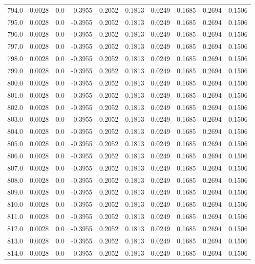 \begin{longtable}{lrrrrrrrrr}
794.0 & 0.0028 & 0.0 & -0.3955 & 0.2052 & 0.1813 & 0.0249 & 0.1685 & 0.2694 & 0.1506 \\
795.0 & 0.0028 & 0.0 & -0.3955 & 0.2052 & 0.1813 & 0.0249 & 0.1685 & 0.2694 & 0.1506 \\
796.0 & 0.0028 & 0.0 & -0.3955 & 0.2052 & 0.1813 & 0.0249 & 0.1685 & 0.2694 & 0.1506 \\
797.0 & 0.0028 & 0.0 & -0.3955 & 0.2052 & 0.1813 & 0.0249 & 0.1685 & 0.2694 & 0.1506 \\
798.0 & 0.0028 & 0.0 & -0.3955 & 0.2052 & 0.1813 & 0.0249 & 0.1685 & 0.2694 & 0.1506 \\
799.0 & 0.0028 & 0.0 & -0.3955 & 0.2052 & 0.1813 & 0.0249 & 0.1685 & 0.2694 & 0.1506 \\
800.0 & 0.0028 & 0.0 & -0.3955 & 0.2052 & 0.1813 & 0.0249 & 0.1685 & 0.2694 & 0.1506 \\
801.0 & 0.0028 & 0.0 & -0.3955 & 0.2052 & 0.1813 & 0.0249 & 0.1685 & 0.2694 & 0.1506 \\
802.0 & 0.0028 & 0.0 & -0.3955 & 0.2052 & 0.1813 & 0.0249 & 0.1685 & 0.2694 & 0.1506 \\
803.0 & 0.0028 & 0.0 & -0.3955 & 0.2052 & 0.1813 & 0.0249 & 0.1685 & 0.2694 & 0.1506 \\
804.0 & 0.0028 & 0.0 & -0.3955 & 0.2052 & 0.1813 & 0.0249 & 0.1685 & 0.2694 & 0.1506 \\
805.0 & 0.0028 & 0.0 & -0.3955 & 0.2052 & 0.1813 & 0.0249 & 0.1685 & 0.2694 & 0.1506 \\
806.0 & 0.0028 & 0.0 & -0.3955 & 0.2052 & 0.1813 & 0.0249 & 0.1685 & 0.2694 & 0.1506 \\
807.0 & 0.0028 & 0.0 & -0.3955 & 0.2052 & 0.1813 & 0.0249 & 0.1685 & 0.2694 & 0.1506 \\
808.0 & 0.0028 & 0.0 & -0.3955 & 0.2052 & 0.1813 & 0.0249 & 0.1685 & 0.2694 & 0.1506 \\
809.0 & 0.0028 & 0.0 & -0.3955 & 0.2052 & 0.1813 & 0.0249 & 0.1685 & 0.2694 & 0.1506 \\
810.0 & 0.0028 & 0.0 & -0.3955 & 0.2052 & 0.1813 & 0.0249 & 0.1685 & 0.2694 & 0.1506 \\
811.0 & 0.0028 & 0.0 & -0.3955 & 0.2052 & 0.1813 & 0.0249 & 0.1685 & 0.2694 & 0.1506 \\
812.0 & 0.0028 & 0.0 & -0.3955 & 0.2052 & 0.1813 & 0.0249 & 0.1685 & 0.2694 & 0.1506 \\
813.0 & 0.0028 & 0.0 & -0.3955 & 0.2052 & 0.1813 & 0.0249 & 0.1685 & 0.2694 & 0.1506 \\
814.0 & 0.0028 & 0.0 & -0.3955 & 0.2052 & 0.1813 & 0.0249 & 0.1685 & 0.2694 & 0.1506 \\

\end{longtable}
